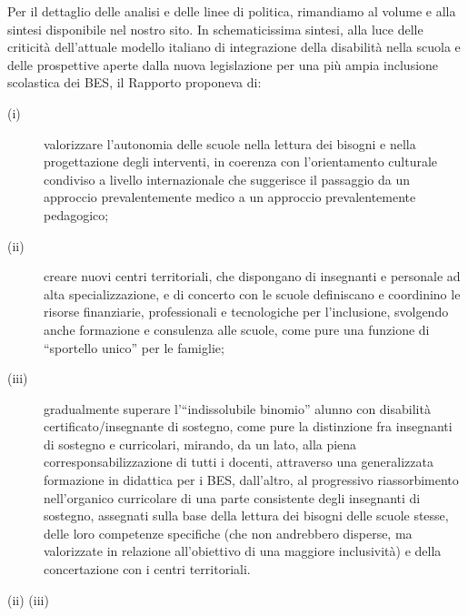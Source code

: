 Per il dettaglio delle analisi e delle linee di politica, rimandiamo al volume e alla sintesi disponibile nel nostro sito. In schematicissima sintesi, alla luce delle criticità dell'attuale modello italiano di integrazione della disabilità nella scuola e delle prospettive aperte dalla nuova legislazione per una più ampia inclusione scolastica dei BES, il Rapporto proponeva di:
\begin{description}
	\item[(i)] valorizzare l'autonomia delle scuole nella lettura dei bisogni e nella progettazione degli interventi, in coerenza con l'orientamento culturale condiviso a livello internazionale che suggerisce il passaggio da un approccio prevalentemente medico a un approccio prevalentemente pedagogico;
	\item[(ii)]creare nuovi centri territoriali, che dispongano di insegnanti e personale ad alta specializzazione, e di concerto con le scuole definiscano e coordinino le risorse finanziarie, professionali e tecnologiche per l’inclusione, svolgendo anche formazione e consulenza alle scuole, come pure una funzione di “sportello unico” per le famiglie;
	\item[(iii)] gradualmente superare l’“indissolubile binomio” alunno con disabilità certificato/insegnante di sostegno, come pure la distinzione fra insegnanti di sostegno e curricolari, mirando, da un lato, alla piena corresponsabilizzazione di tutti i docenti, attraverso una generalizzata formazione in didattica per i BES, dall’altro, al progressivo riassorbimento nell’organico curricolare di una parte consistente degli insegnanti di sostegno, assegnati sulla base della lettura dei bisogni delle scuole stesse, delle loro competenze specifiche (che non andrebbero disperse, ma valorizzate in relazione all’obiettivo di una maggiore inclusività) e della concertazione con i centri territoriali.
\end{description}

(ii) 
(iii)


